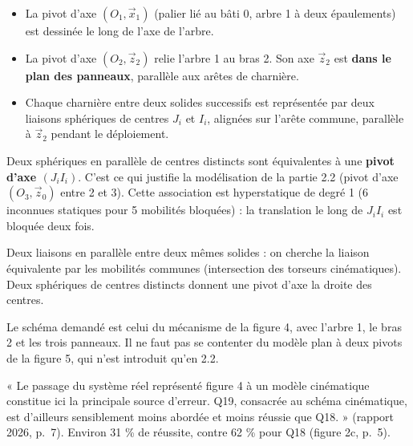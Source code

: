 \documentclass[11pt,a4paper]{article}
\providecommand{\tightlist}{\setlength{\itemsep}{0pt}\setlength{\parskip}{0pt}}
\begin{document}
\begin{itemize}
\tightlist
\item
  La pivot d'axe \((O_1,\vec x_1)\) (palier lié au bâti 0, arbre 1 à deux épaulements) est dessinée le long de l'axe de l'arbre.
\item
  La pivot d'axe \((O_2,\vec z_2)\) relie l'arbre 1 au bras 2. Son axe \(\vec z_2\) est \textbf{dans le plan des panneaux}, parallèle aux arêtes de charnière.
\item
  Chaque charnière entre deux solides successifs est représentée par deux liaisons sphériques de centres \(J_i\) et \(I_i\), alignées sur l'arête commune, parallèle à \(\vec z_2\) pendant le déploiement.
\end{itemize}

Deux sphériques en parallèle de centres distincts sont équivalentes à une \textbf{pivot d'axe \((J_iI_i)\)}. C'est ce qui justifie la modélisation de la partie 2.2 (pivot d'axe \((O_3,\vec z_0)\) entre 2 et 3). Cette association est hyperstatique de degré 1 (6 inconnues statiques pour 5 mobilités bloquées) : la translation le long de \(J_iI_i\) est bloquée deux fois.

\begin{methode}

Deux liaisons en parallèle entre deux mêmes solides : on cherche la liaison équivalente par les mobilités communes (intersection des torseurs cinématiques). Deux sphériques de centres distincts donnent une pivot d'axe la droite des centres.

\end{methode}

\begin{piege}

Le schéma demandé est celui du mécanisme de la figure 4, avec l'arbre 1, le bras 2 et les trois panneaux. Il ne faut pas se contenter du modèle plan à deux pivots de la figure 5, qui n'est introduit qu'en 2.2.

\end{piege}

\begin{jury}

« Le passage du système réel représenté figure 4 à un modèle cinématique constitue ici la principale source d'erreur. Q19, consacrée au schéma cinématique, est d'ailleurs sensiblement moins abordée et moins réussie que Q18. » (rapport 2026, p.~7). Environ 31 \% de réussite, contre 62 \% pour Q18 (figure 2c, p.~5).

\end{jury}
\end{document}
